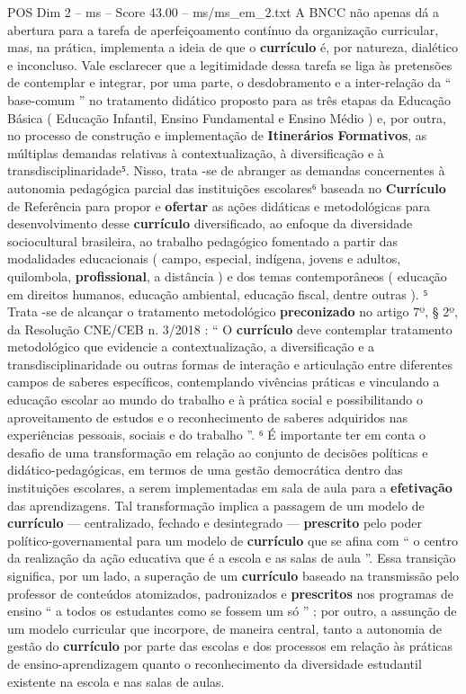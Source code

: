\begin{textsample}{POS Dim 2 – ms – Score 43.00 – ms/ms\_em\_2.txt}
A BNCC não apenas dá a abertura para a tarefa de aperfeiçoamento contínuo da organização curricular, mas, na prática, implementa a ideia de que o \textbf{currículo} é, por natureza, dialético e inconcluso.
Vale esclarecer que a legitimidade dessa tarefa se liga às pretensões de contemplar e integrar, por uma parte, o desdobramento e a inter-relação da “ base-comum ” no tratamento didático proposto para as três etapas da Educação Básica ( Educação Infantil, Ensino Fundamental e Ensino Médio ) e, por outra, no processo de construção e implementação de \textbf{Itinerários} \textbf{Formativos}, as múltiplas demandas relativas à contextualização, à diversificação e à transdisciplinaridade⁵.
Nisso, trata -se de abranger as demandas concernentes à autonomia pedagógica parcial das instituições escolares⁶ baseada no \textbf{Currículo} de Referência para propor e \textbf{ofertar} as ações didáticas e metodológicas para desenvolvimento desse \textbf{currículo} diversificado, ao enfoque da diversidade sociocultural brasileira, ao trabalho pedagógico fomentado a partir das modalidades educacionais ( campo, especial, indígena, jovens e adultos, quilombola, \textbf{profissional}, a distância ) e dos temas contemporâneos ( educação em direitos humanos, educação ambiental, educação fiscal, dentre outras ). ⁵ Trata -se de alcançar o tratamento metodológico \textbf{preconizado} no artigo 7º, § 2º, da Resolução CNE/CEB n. 3/2018 : “ O \textbf{currículo} deve contemplar tratamento metodológico que evidencie a contextualização, a diversificação e a transdisciplinaridade ou outras formas de interação e articulação entre diferentes campos de saberes específicos, contemplando vivências práticas e vinculando a educação escolar ao mundo do trabalho e à prática social e possibilitando o aproveitamento de estudos e o reconhecimento de saberes adquiridos nas experiências pessoais, sociais e do trabalho ”. ⁶ É importante ter em conta o desafio de uma transformação em relação ao conjunto de decisões políticas e didático-pedagógicas, em termos de uma gestão democrática dentro das instituições escolares, a serem implementadas em sala de aula para a \textbf{efetivação} das aprendizagens.
Tal transformação implica a passagem de um modelo de \textbf{currículo} — centralizado, fechado e desintegrado — \textbf{prescrito} pelo poder político-governamental para um modelo de \textbf{currículo} que se afina com “ o centro da realização da ação educativa que é a escola e as salas de aula ”.
Essa transição significa, por um lado, a superação de um \textbf{currículo} baseado na transmissão pelo professor de conteúdos atomizados, padronizados e \textbf{prescritos} nos programas de ensino “ a todos os estudantes como se fossem um só ” ; por outro, a assunção de um modelo curricular que incorpore, de maneira central, tanto a autonomia de gestão do \textbf{currículo} por parte das escolas e dos processos em relação às práticas de ensino-aprendizagem quanto o reconhecimento da diversidade estudantil existente na escola e nas salas de aulas.

\end{textsample}
